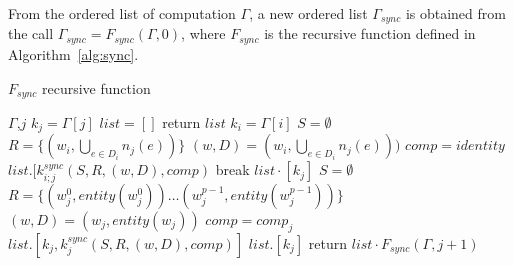 \begin{mydef}
From the ordered list of computation $\Gamma$, a new ordered list $\Gamma_{sync}$ is obtained from the call $\Gamma_{sync} = F_{sync}(\Gamma,0)$, where $F_{sync}$ is the recursive function defined in Algorithm~\ref{alg:sync}.

\begin{algorithm}
\caption{$F_{sync}$ recursive function}
\label{alg:sync}
\begin{algorithmic}[1]
 {$\Gamma$,$j$}
\State $k_j = \Gamma[j]$
\State $list = []$
\State return $list$
\State $k_i = \Gamma[i]$
\State $S = \emptyset$
\State $R = \{(w_i,\bigcup_{e \in D_i} n_j(e))\}$
\State $(w,D) = (w_i,\bigcup_{e \in D_i} n_j(e)))$
\State $comp = identity$
\State $list.[k_{i;j}^{sync}(S,R,(w,D),comp)$
\State break
\EndIf
\EndFor
\State $list \cdot [k_j]$
\State $S = \emptyset$
\State $R = \{(w^0_j,entity(w^0_j)) \dots (w^{p-1}_j,entity(w^{p-1}_j))\}$
\State $(w,D) = (w_j,entity(w_j))$
\State $comp = comp_j$
\State $list.[k_j, k_{j}^{sync}(S,R,(w,D),comp)]$
\Else
\State $list.[k_j]$
\EndIf
\State return $list \cdot F_{sync}(\Gamma,j+1)$
\EndProcedure
\end{algorithmic}
\end{algorithm}

\end{mydef}


